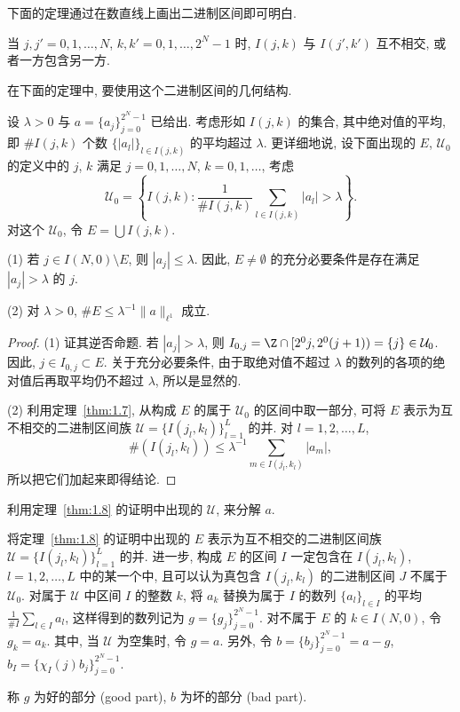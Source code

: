 下面的定理通过在数直线上画出二进制区间即可明白.

\begin{theorem}\label{thm:1.7}
当 $j, j' = 0, 1, \ldots, N$, $k, k' = 0, 1, \ldots, 2^{N}-1$ 时, $I(j,k)$ 与 $I(j',k')$ 互不相交, 或者一方包含另一方.
\end{theorem}

在下面的定理中, 要使用这个二进制区间的几何结构.

\begin{theorem}\label{thm:1.8}
设 $\lambda > 0$ 与 $a = \{a_{j}\}_{j=0}^{2^{N}-1}$ 已给出. 考虑形如 $I(j,k)$ 的集合, 其中绝对值的平均, 即 $\# I(j,k)$ 个数 $\{|a_{l}|\}_{l \in I(j,k)}$ 的平均超过 $\lambda$. 更详细地说, 设下面出现的 $E$, $\mathcal{U}_{0}$ 的定义中的 $j$, $k$ 满足 $j = 0, 1, \ldots, N$, $k = 0, 1, \ldots$, 考虑
\[
\mathcal{U}_{0} = \left\{I(j,k) : \frac{1}{\# I(j,k)}\sum_{l \in I(j,k)} |a_{l}| > \lambda\right\}.
\]
对这个 $\mathcal{U}_{0}$, 令 $E = \bigcup I(j,k)$.

(1) 若 $j \in I(N,0) \setminus E$, 则 $|a_{j}| \leq \lambda$. 因此, $E \neq \emptyset$ 的充分必要条件是存在满足 $|a_{j}| > \lambda$ 的 $j$.

(2) 对 $\lambda > 0$, $\# E \leq \lambda^{-1}\|a\|_{\ell^{1}}$ 成立.
\end{theorem}

\begin{proof}
(1) 证其逆否命题. 若 $|a_{j}| > \lambda$, 则 $I_{0,j} = \Z \cap [2^{0}j, 2^{0}(j+1)) = \{j\} \in \mathcal{U}_{0}$. 因此, $j \in I_{0,j} \subset E$. 关于充分必要条件, 由于取绝对值不超过 $\lambda$ 的数列的各项的绝对值后再取平均仍不超过 $\lambda$, 所以是显然的.

(2) 利用定理~\ref{thm:1.7}, 从构成 $E$ 的属于 $\mathcal{U}_{0}$ 的区间中取一部分, 可将 $E$ 表示为互不相交的二进制区间族 $\mathcal{U} = \{I(j_{l}, k_{l})\}_{l=1}^{L}$ 的并. 对 $l = 1, 2, \ldots, L$,
\[
\#(I(j_{l}, k_{l})) \leq \lambda^{-1}\sum_{m \in I(j_{l}, k_{l})} |a_{m}|,
\]
所以把它们加起来即得结论.
\end{proof}

利用定理~\ref{thm:1.8} 的证明中出现的 $\mathcal{U}$, 来分解 $a$.

\begin{definition}\label{def:1.4}
将定理~\ref{thm:1.8} 的证明中出现的 $E$ 表示为互不相交的二进制区间族 $\mathcal{U} = \{I(j_{l}, k_{l})\}_{l=1}^{L}$ 的并. 进一步, 构成 $E$ 的区间 $I$ 一定包含在 $I(j_{l}, k_{l})$, $l = 1, 2, \ldots, L$ 中的某一个中, 且可以认为真包含 $I(j_{l}, k_{l})$ 的二进制区间 $J$ 不属于 $\mathcal{U}_{0}$. 对属于 $\mathcal{U}$ 中区间 $I$ 的整数 $k$, 将 $a_{k}$ 替换为属于 $I$ 的数列 $\{a_{l}\}_{l \in I}$ 的平均 $\frac{1}{\# I}\sum_{l \in I} a_{l}$, 这样得到的数列记为 $g = \{g_{j}\}_{j=0}^{2^{N}-1}$. 对不属于 $E$ 的 $k \in I(N, 0)$, 令 $g_{k} = a_{k}$. 其中, 当 $\mathcal{U}$ 为空集时, 令 $g = a$. 另外, 令 $b = \{b_{j}\}_{j=0}^{2^{N}-1} = a - g$, $b_{I} = \{\chi_{I}(j)b_{j}\}_{j=0}^{2^{N}-1}$.

称 $g$ 为好的部分 (good part), $b$ 为坏的部分 (bad part).
\end{definition}

